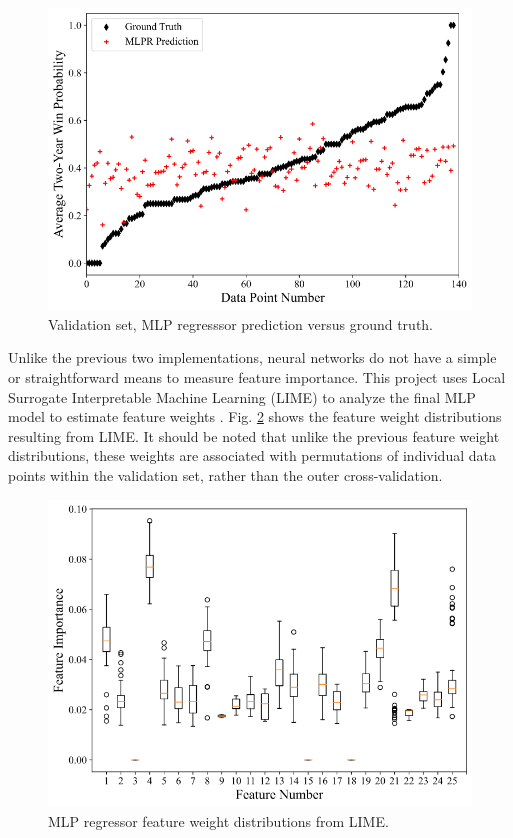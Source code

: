 \documentclass[conference]{IEEEtran}
\begin{document}
\begin{figure}[htbp]
\centerline{\includegraphics[width=1\linewidth]{test3.png}}
\caption{Validation set, MLP regresssor prediction versus ground truth.}
\label{fig8}
\end{figure}

Unlike the previous two implementations, neural networks do not have a simple or straightforward means to measure feature importance. This project uses Local Surrogate Interpretable Machine Learning (LIME) to analyze the final MLP model to estimate feature weights \cite{b9}. Fig. \ref{fig9} shows the feature weight distributions resulting from LIME. It should be noted that unlike the previous feature weight distributions, these weights are associated with permutations of individual data points within the validation set, rather than the outer cross-validation.

\begin{figure}[htbp]
\centerline{\includegraphics[width=1\linewidth]{weight3.png}}
\caption{MLP regressor feature weight distributions from LIME.}
\label{fig9}
\end{figure}
\end{document}
